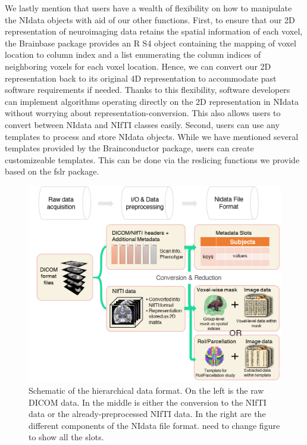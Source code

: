 \documentclass{nature}
\begin{document}
We lastly mention that users have a wealth of flexibility on how to manipulate the NIdata
objects with aid of our other functions. 
First, to ensure that our 2D representation of neuroimaging data retains the
spatial information of each voxel, the Brainbase package provides
an R S4 object containing the mapping of voxel location to column index and
a list enumerating the column indices of neighboring voxels for each voxel
location. Hence, we can convert our 2D representation back to its original
4D representation to accommodate past software requirements if needed.
Thanks to this flexibility, software developers can
implement algorithms operating directly on the 2D representation in
NIdata without worrying about representation-conversion. This also allows users 
to convert between NIdata and NIfTI classes easily. Second, users can use any
templates to process and store NIdata objects. While we have mentioned several templates
provided by the Brainconductor package, users can create customizeable templates. 
This can be done via the reslicing
functions
we provide based on the fslr package. 

\begin{figure}[tb]
\centering
\includegraphics[width=400pt]{fig/brainconductor/file_format.png}
\caption{Schematic of the hierarchical data format. On the left is the raw DICOM
data. In the middle is either the conversion to the NIfTI data or the
already-preprocessed
NIfTI data. In the right are the different components of the NIdata file format.
{\color{red}need to change figure to show all the slots. }
}
\label{fig:fileformat}
\end{figure}
\end{document}
